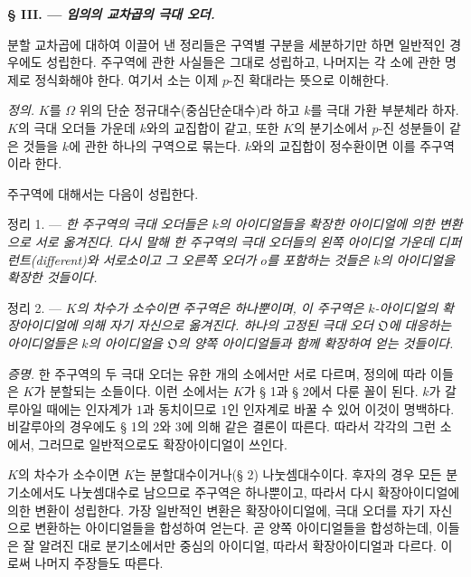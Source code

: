 
\begin{center}
\textbf{§ III. --- \emph{임의의 교차곱의 극대 오더.}}
\end{center}

분할 교차곱에 대하여 이끌어 낸 정리들은 구역별 구분을 세분하기만 하면 일반적인 경우에도 성립한다. 주구역에 관한 사실들은 그대로 성립하고, 나머지는 각 소에 관한 명제로 정식화해야 한다. 여기서 소는 이제 $p$-진 확대라는 뜻으로 이해한다.

\emph{정의.} $K$를 $\Omega$ 위의 단순 정규대수(중심단순대수)라 하고 $k$를 극대 가환 부분체라 하자. $K$의 극대 오더들 가운데 $k$와의 교집합이 같고, 또한 $K$의 분기소에서 $p$-진 성분들이 같은 것들을 $k$에 관한 하나의 구역으로 묶는다. $k$와의 교집합이 정수환이면 이를 주구역이라 한다.

주구역에 대해서는 다음이 성립한다.

\medskip
\noindent\textsc{정리 1. ---} \emph{한 주구역의 극대 오더들은 $k$의 아이디얼들을 확장한 아이디얼에 의한 변환으로 서로 옮겨진다. 다시 말해 한 주구역의 극대 오더들의 왼쪽 아이디얼 가운데 디퍼런트(different)와 서로소이고 그 오른쪽 오더가 $o$를 포함하는 것들은 $k$의 아이디얼을 확장한 것들이다.}

\medskip
\noindent\textsc{정리 2. ---} \emph{$K$의 차수가 소수이면 주구역은 하나뿐이며, 이 주구역은 $k$-아이디얼의 확장아이디얼에 의해 자기 자신으로 옮겨진다. 하나의 고정된 극대 오더 $\mathfrak O$에 대응하는 아이디얼들은 $k$의 아이디얼을 $\mathfrak O$의 양쪽 아이디얼들과 함께 확장하여 얻는 것들이다.}

\emph{증명.} 한 주구역의 두 극대 오더는 유한 개의 소에서만 서로 다르며, 정의에 따라 이들은 $K$가 분할되는 소들이다. 이런 소에서는 $K$가 § 1과 § 2에서 다룬 꼴이 된다. $k$가 갈루아일 때에는 인자계가 $1$과 동치이므로 $1$인 인자계로 바꿀 수 있어 이것이 명백하다. 비갈루아의 경우에도 § 1의 2와 3에 의해 같은 결론이 따른다. 따라서 각각의 그런 소에서, 그러므로 일반적으로도 확장아이디얼이 쓰인다.

$K$의 차수가 소수이면 $K$는 분할대수이거나(§ 2) 나눗셈대수이다. 후자의 경우 모든 분기소에서도 나눗셈대수로 남으므로 주구역은 하나뿐이고, 따라서 다시 확장아이디얼에 의한 변환이 성립한다. 가장 일반적인 변환은 확장아이디얼에, 극대 오더를 자기 자신으로 변환하는 아이디얼들을 합성하여 얻는다. 곧 양쪽 아이디얼들을 합성하는데, 이들은 잘 알려진 대로 분기소에서만 중심의 아이디얼, 따라서 확장아이디얼과 다르다. 이로써 나머지 주장들도 따른다.

